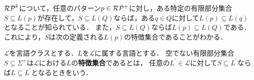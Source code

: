 
$\mathcal{RP}^{k}$について，任意のパターン$p\in \mathcal{RP^{+}}$に対し，ある特定の有限部分集合$S \subseteq L(p)$が存在して，$S \subseteq L(Q)$ならば，ある$q \in Q$に対して$L(p) \subseteq L(q)$となることが知られている\cite{Mukouchi1991}．
また，$S \subseteq L(Q)$ならば$L(p) \subseteq L(Q)$である．
これにより，$S$は次の定義される$L(p)$の特徴集合であることがわかる．
\begin{dfn}
$\mathcal{L}$を言語クラスとする．$L$を$\mathcal{L}$に属する言語とする．
空でない有限部分集合$S \subseteq \Sigma^{+}$は$\mathcal{L}$における$L$の\textbf{特徴集合}であるとは，
任意の$L^{\prime} \in \mathcal{L}$に対して$S \subseteq L^{\prime}$ならば$L \subseteq L^{\prime}$となるときをいう．
\end{dfn}
\noindent
